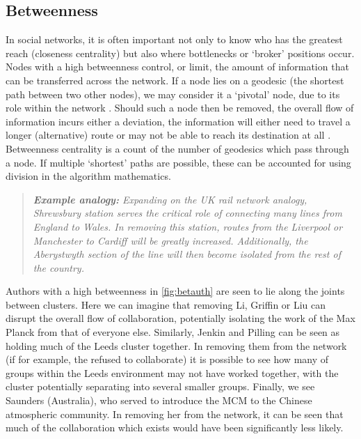 \subsection{Betweenness}
In social networks, it is often important not only to know who has the greatest reach (closeness centrality) but also where bottlenecks or `broker' positions occur. Nodes with a high betweenness control, or limit, the amount of information that can be transferred across the network. If a node lies on a geodesic (the shortest path between two other nodes), we may consider it a `pivotal' node, due to its role within the network \citep{neoj4}. Should such a node then be removed, the overall flow of information incurs either a deviation, the information will either need to travel a longer (alternative) route or may not be able to reach its destination at all \citep{betweenness, between, betweenfast,examples_centrality}.
Betweenness centrality is a count of the number of geodesics which pass through a node. If multiple `shortest' paths are possible, these can be accounted for using division in the algorithm mathematics. 


\begin{quote}
\textit{
\textbf{Example analogy:} Expanding on the UK rail network analogy, Shrewsbury station serves the critical role of connecting many lines from England to Wales. In removing this station, routes from the Liverpool or Manchester to Cardiff will be greatly increased. Additionally, the Aberystwyth section of the line will then become isolated from the rest of the country.
}
\end{quote}

Authors with a high betweenness in \autoref{fig:betauth} are seen to lie along the joints between clusters. Here we can imagine that removing Li, Griffin or Liu can disrupt the overall flow of collaboration, potentially isolating the work of the Max Planck from that of everyone else. Similarly, Jenkin and Pilling can be seen as holding much of the Leeds cluster together. In removing them from the network (if for example, the refused to collaborate) it is possible to see how many of groups within the Leeds environment may not have worked together, with the cluster potentially separating into several smaller groups. Finally, we see Saunders (Australia), who served to introduce the MCM to the Chinese atmospheric community. In removing her from the network, it can be seen that much of the collaboration which exists would have been significantly less likely.  

